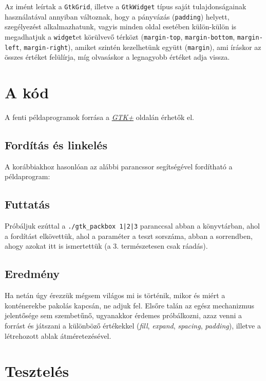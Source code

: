 Az imént leírtak a \texttt{GtkGrid}, illetve a \texttt{GtkWidget} típus saját tulajdonságainak használatával annyiban változnak, hogy a pányvázás (\texttt{padding}) helyett, szegélyezést alkalmazhatunk, vagyis minden oldal esetében külön-külön is megadhatjuk a \texttt{widget}et körülvevő térközt (\texttt{margin-top}, \texttt{margin-bottom}, \texttt{margin-left}, \texttt{margin-right}), amiket szintén kezelhetünk együtt (\texttt{margin}), ami íráskor az összes értéket felülírja, míg olvasáskor a legnagyobb értéket adja vissza. 

\section{A kód}

A fenti példaprogramok forrása a \href{http://developer.gnome.org/gtk-tutorial/stable/x386.html}{\textit{GTK+}} oldalán érhetők el.

\subsection{Fordítás és linkelés}

A korábbiakhoz hasonlóan az alábbi parancssor segítségével fordítható a példaprogram:


\subsection{Futtatás}

Próbáljuk ezúttal a \texttt{./gtk\_packbox 1|2|3} paranccsal abban a könyvtárban, ahol a fordítást elkövettük, ahol a paraméter a teszt sorszáma, abban a sorrendben, ahogy azokat itt is ismertettük (a 3. természetesen csak ráadás).

\subsection{Eredmény}

Ha netán úgy érezzük mégsem világos mi is történik, mikor és miért a konténerekbe pakolás kapcsán, ne adjuk fel. Elsőre talán az egész mechanizmus jelentősége sem szembetűnő, ugyanakkor érdemes próbálkozni, azaz venni a forrást és játszani a különböző értékekkel (\textit{fill}, \textit{expand}, \textit{spacing}, \textit{padding}), illetve a létrehozott ablak átméretezésével.

\section{Tesztelés}

